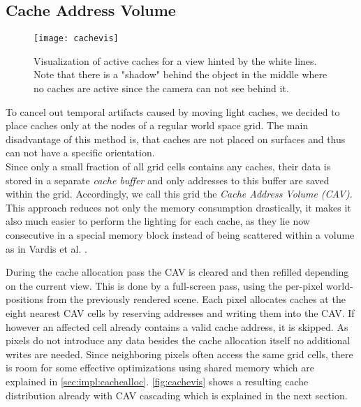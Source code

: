 \documentclass[thesis.tex]{subfiles}
\begin{document}
\subsection{Cache Address Volume}
\begin{figure}[h]
	\centering
	\texttt{[image: cachevis]}
	\caption{Visualization of active caches for a view hinted by the white lines. Note that there is a "shadow" behind the object in the middle where no caches are active since the camera can not see behind it.} \label{fig:cachevis}
\end{figure}
To cancel out temporal artifacts caused by moving light caches, we decided to place caches only at the nodes of a regular world space grid.
The main disadvantage of this method is, that caches are not placed on surfaces and thus can not have a specific orientation.\\
Since only a small fraction of all grid cells contains any caches, their data is stored in a separate \emph{cache buffer} and only addresses to this buffer are saved within the grid.
Accordingly, we call this grid the \emph{Cache Address Volume (CAV)}.
This approach reduces not only the memory consumption drastically, it makes it also much easier to perform the lighting for each cache, as they lie now consecutive in a special memory block instead of being scattered within a volume as in Vardis et al. \cite{bib:radiancecachechromaticcompression}.

During the cache allocation pass the CAV is cleared and then refilled depending on the current view.
This is done by a full-screen pass, using the per-pixel world-positions from the previously rendered scene. %
Each pixel allocates caches at the eight nearest CAV cells by reserving addresses and writing them into the CAV.
If however an affected cell already contains a valid cache address, it is skipped.
As pixels do not introduce any data besides the cache allocation itself no additional writes are needed.
Since neighboring pixels often access the same grid cells, there is room for some effective optimizations using shared memory which are explained in \autoref{sec:impl:cachealloc}.
\autoref{fig:cachevis} shows a resulting cache distribution already with CAV cascading which is explained in the next section.
\end{document}
